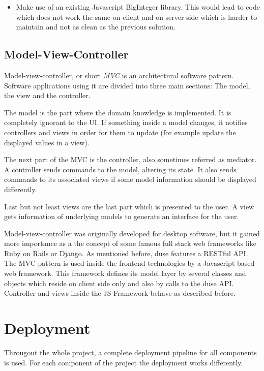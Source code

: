 \begin{itemize}
\begin{itemize}
    \item Make use of an existing Javascript BigInteger library. This would
    lead to code which does not work the same on client and on server side which
    is harder to maintain and not as clean as the previous solution.
  \end{itemize}
\end{itemize}

\subsection{Model-View-Controller}

Model-view-controller, or short \textit{MVC} is an architectural software pattern.
Software applications using it are divided into three main sections: The model,
the view and the controller.

The model is the part where the domain knowledge is implemented. It is completely
ignorant to the UI. If something inside a model changes, it notifies controllers
and views in order for them to update (for example update the displayed values
in a view).

The next part of the MVC is the controller, also sometimes referred as mediator.
A controller sends commands to the model, altering its state. It also sends commands
to its associated views if some model information should be displayed differently.

Last but not least views are the last part which is presented to the user. A view
gets information of underlying models to generate an interface for the user.

Model-view-controller was originally developed for desktop software, but it gained
more importance as a the concept of some famous full stack web frameworks like
Ruby on Rails or Django. As mentioned before, duse features a RESTful API. The 
MVC pattern is used inside the frontend technologies by a Javascript based web
framework. This framework defines its model layer by several classes and objects
which reside on client side only and also by calls to the duse API. Controller and
views inside the JS-Framework behave as described before.

\section{Deployment}

Througout the whole project, a complete deployment pipeline for all components
is used. For each component of the project the deployment works differently.

